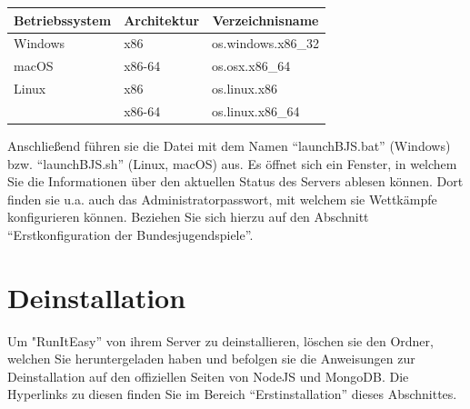 \documentclass[11pt,a4paper,titlepage,german]{article}
\begin{document}
			\begin{center}
				\def\arraystretch{2}
				\begin{tabular}{ l | l | l }
					\multicolumn{1}{c}{\bfseries Betriebssystem} & \multicolumn{1}{c}{\bfseries Architektur} & \multicolumn{1}{c}{\bfseries Verzeichnisname} \\
					\hline
					Windows & x86 & os.windows.x86\_32 \\
					\hline
					macOS & x86-64 & os.osx.x86\_64 \\
					\hline
					Linux & x86 & os.linux.x86 \\
					 & x86-64 & os.linux.x86\_64
				\end{tabular}
			\end{center}
			
			Anschließend führen sie die Datei mit dem Namen “launchBJS.bat” (Windows) bzw. “launchBJS.sh” (Linux, macOS) aus. Es öffnet sich ein Fenster, in welchem Sie die Informationen über den aktuellen Status des Servers ablesen können. Dort finden sie u.a. auch das Administratorpasswort, mit welchem sie Wettkämpfe konfigurieren können. Beziehen Sie sich hierzu auf den Abschnitt “Erstkonfiguration der Bundesjugendspiele”.
			
		\section{Deinstallation}
			Um "RunItEasy” von ihrem Server zu deinstallieren, löschen sie den Ordner, welchen Sie heruntergeladen haben und befolgen sie die Anweisungen zur Deinstallation auf den offiziellen Seiten von NodeJS und MongoDB. Die Hyperlinks zu diesen finden Sie im Bereich “Erstinstallation” dieses Abschnittes.
		
	\newpage
		
\end{document}
